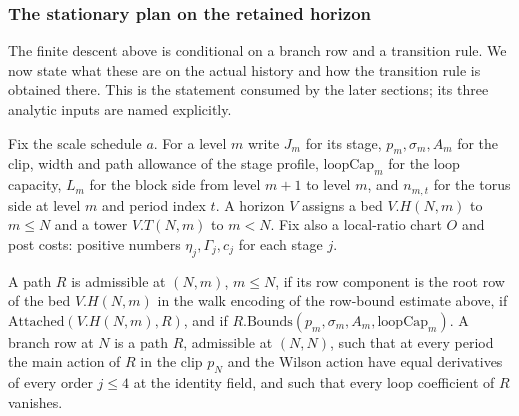 \subsubsection{The stationary plan on the retained horizon}
\label{subsec:path-retained-plan}

The finite descent above is conditional on a branch row and a transition
rule. We now state what these are on the actual history and how the
transition rule is obtained there. This is the statement consumed by the
later sections; its three analytic inputs are named explicitly.

Fix the scale schedule $a$. For a level $m$ write $J_m$ for its stage,
$p_m,\sigma_m,A_m$ for the clip, width and path allowance of the stage
profile, $\mathrm{loopCap}_m$ for the loop capacity, $L_m$ for the
block side from level $m+1$ to level $m$, and $n_{m,t}$ for the torus
side at level $m$ and period index $t$. A horizon $V$ assigns a bed
$V.H(N,m)$ to $m\le N$ and a tower $V.T(N,m)$ to $m<N$. Fix also a
local-ratio chart $O$ and post costs: positive numbers
$\eta_j,\Gamma_j,c_j$ for each stage $j$.

\begin{definition}
\label{def:path-admissible}
A path $R$ is admissible at $(N,m)$, $m\le N$, if its row component is
the root row of the bed $V.H(N,m)$ in the walk encoding of the row-bound
estimate above, if $\mathrm{Attached}(V.H(N,m),R)$, and if
$R.\mathrm{Bounds}(p_m,\sigma_m,A_m,\mathrm{loopCap}_m)$. A branch row
at $N$ is a path $R$, admissible at $(N,N)$, such that at every period
the main action of $R$ in the clip $p_N$ and the Wilson action have
equal derivatives of every order $j\le4$ at the identity field, and
such that every loop coefficient of $R$ vanishes.
\end{definition}

